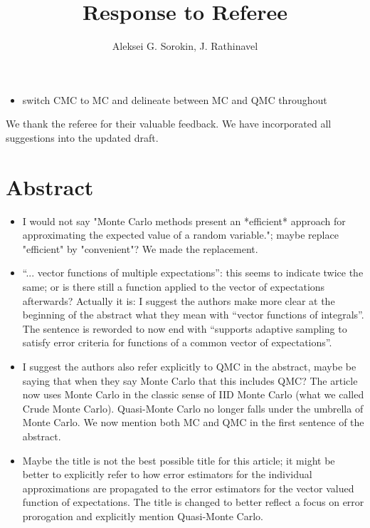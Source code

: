\documentclass{article}[12pt]
\title{Response to Referee}
\author{Aleksei G. Sorokin, J. Rathinavel}
\date{}
\newcommand{\Referee}[1]{{\color{blue} #1 \newline}}
\newcommand{\MISCComment}[1]{{\color{purple} #1 \newline}}
\begin{document}
\maketitle    

\begin{itemize}
    \item \MISCComment{switch CMC to MC and delineate between MC and QMC throughout}
\end{itemize}

We thank the referee for their valuable  feedback. We have incorporated all suggestions into the updated draft. 

\section{Abstract}

\begin{itemize}
    \item \Referee{I would not say "Monte Carlo methods present an *efficient* approach for approximating the expected value of a random variable."; maybe replace "efficient" by "convenient"?}We made the replacement.
    \item \Referee{``... vector functions of multiple expectations'': this seems to indicate twice the same; or is there still a function applied to the vector of expectations afterwards? Actually it is: I suggest the authors make more clear at the beginning of the abstract what they mean with ``vector functions of integrals''.}The sentence is reworded to now end with ``supports adaptive sampling to satisfy error criteria for functions of a common vector of expectations''.
    \item \Referee{I suggest the authors also refer explicitly to QMC in the abstract, maybe be saying that when they say Monte Carlo that this includes QMC?}The article  now uses Monte Carlo in the classic sense of IID Monte Carlo (what we called Crude Monte Carlo). Quasi-Monte Carlo no longer falls under the umbrella of Monte Carlo.  We now mention both MC and QMC in the first sentence of the abstract. 
    \item \Referee{Maybe the title is not the best possible title for this article; it might be better to explicitly refer to how error estimators for the individual approximations are propagated to the error estimators for the vector valued function of expectations.}The title is changed to better reflect a focus on error prorogation and explicitly mention Quasi-Monte Carlo. 
\end{itemize}
\end{document}
